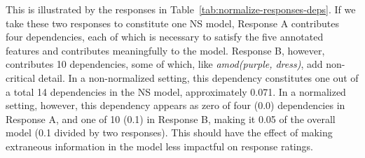 This is illustrated by the responses in Table~\ref{tab:normalize-responses-deps}. If we take these two responses to constitute one NS model, Response A contributes four dependencies, each of which is necessary to satisfy the five annotated features and contributes meaningfully to the model. Response B, however, contributes 10 dependencies, some of which, like \textit{amod(purple, dress)}, add non-critical detail. In a non-normalized setting, this dependency constitutes one out of a total 14 dependencies in the NS model, approximately 0.071. In a normalized setting, however, this dependency appears as zero of four (0.0) dependencies in Response A, and one of 10 (0.1) in Response B, making it 0.05 of the overall model (0.1 divided by two responses). This should have the effect of making extraneous information in the model less impactful on response ratings.

